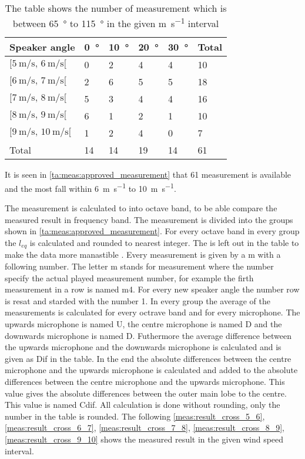 \begin{table}[H]
\centering
\caption{The table shows the number of measurement which is between \SI{65}{\degree} to \SI{115}{\degree} in the given \si{\meter\per\second} interval}
\begin{tabular}{l|l|l|l|l|l}
Speaker angle & \SI{0}{\degree}  & \SI{10}{\degree} & \SI{20}{\degree} & \SI{30}{\degree} & Total \\ \hline
$[\SI{5}{\meter\per\second},\, \SI{6}{\meter\per\second}[ $         & 0  & 2  & 4  & 4  & 10    \\
$[\SI{6}{\meter\per\second},\, \SI{7}{\meter\per\second}[$           & 2  & 6  & 5  & 5  & 18    \\
$[\SI{7}{\meter\per\second},\, \SI{8}{\meter\per\second}[ $          & 5  & 3  & 4  & 4  & 16    \\
$[\SI{8}{\meter\per\second},\, \SI{9}{\meter\per\second}[ $          & 6  & 1  & 2  & 1  & 10    \\
$[\SI{9}{\meter\per\second},\, \SI{10}{\meter\per\second}[  $        & 1  & 2  & 4  & 0  & 7     \\ \hline
Total         & 14 & 14 & 19 & 14 &   61   
\end{tabular}
\label{ta:meas:approved_measurement}
\end{table}

It is seen in \autoref{ta:meas:approved_measurement} that 61 measurement is available and the most fall within \SI{6}{\meter\per\second} to \SI{10}{\meter\per\second}.

The measurement is calculated to into octave band, to be able compare the measured result in frequency band. The measurement is divided into the groups shown in \autoref{ta:meas:approved_measurement}. For every octave band in every group the $l_{eq}$ is calculated and rounded to nearest integer. The \db is left out in the table to make the data more manastible . Every measurement is given by a m with a following number. The letter m stands for measurement where the number specify the actual played measurement number, for example the firth measurement in a row is named m4. For every new speaker angle the number row is resat and starded with the number 1. In every group the average of the measurements is calculated for every octrave band and for every microphone. The upwards microphone is named U, the centre microphone is named D and the downwards microphone is named D. Futhermore the average difference between the upwards microphone and the downwards microphone is calculated and is given as Dif in the table. In the end the absolute differences between the centre microphone and the upwards microphone is calculated and added to the absolute differences between the centre microphone and the upwards microphone. This value gives the absolute differences between the outer main lobe to the centre. This value is named Cdif. All calculation is done without rounding, only the number in the table is rounded. The following \autoref{meas:result_cross_5_6}, \autoref{meas:result_cross_6_7}, \autoref{meas:result_cross_7_8}, \autoref{meas:result_cross_8_9}, \autoref{meas:result_cross_9_10} shows the measured result in the given wind speed interval.


